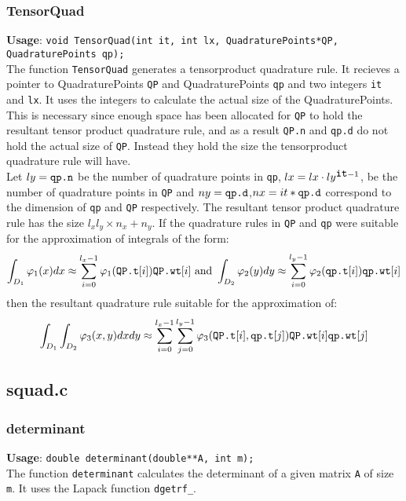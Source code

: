 \documentclass[a4paper,10pt]{article}
\begin{document}
\subsubsection{TensorQuad}
\textbf{Usage}: \verb=void TensorQuad(int it, int lx, QuadraturePoints*QP, QuadraturePoints qp);=\\
The function \verb=TensorQuad= generates a tensorproduct quadrature rule. It recieves a pointer to
 QuadraturePoints \verb=QP= and QuadraturePoints \verb=qp= and two integers \verb=it=
and \verb=lx=. It uses the integers to calculate the actual size of the QuadraturePoints. This is necessary
since enough space has been allocated for \verb=QP= to hold the resultant tensor product quadrature rule, and
as a result \verb=QP.n= and \verb=qp.d= do not hold the actual size of \verb=QP=. Instead they hold the size
the tensorproduct quadrature rule will have.\\
Let $ly=\verb=qp.n=$ be the number of quadrature points in \verb=qp=, $lx=lx \cdot ly^{\verb=it=-1}$, be the number of 
quadrature points in \verb=QP= and $ny=\verb=qp.d=$,$nx=it*\verb=qp.d=$ correspond to the dimension of \verb=qp= and 
\verb=QP= respectively. The resultant tensor product quadrature rule has the size $l_x l_y \times n_x+n_y$.
If the quadrature rules in \verb=QP= and \verb=qp= were suitable for the approximation of integrals of the 
form:\begin{displaymath}
      \int_{D_1}\varphi_1(x)dx\approx\sum_{i=0}^{l_x-1}\varphi_1(\verb=QP.t=[i])\verb=QP.wt=[i] \text{ and }
      \int_{D_2}\varphi_2(y)dy\approx\sum_{i=0}^{l_y-1}\varphi_2(\verb=qp.t=[i])\verb=qp.wt=[i]
     \end{displaymath}
then the resultant quadrature rule suitable for the approximation of:
\begin{displaymath}
 \int_{D_1}\int_{D_2}\varphi_3(x,y)dx dy\approx\sum_{i=0}^{l_x-1}\sum_{j=0}^{l_y-1}
                \varphi_3(\verb=QP.t=[i],\verb=qp.t=[j])\verb=QP.wt=[i]\verb=qp.wt=[j]
\end{displaymath}

\subsection{squad.c}
\subsubsection{determinant}
\textbf{Usage}: \verb=double determinant(double**A, int m);=\\
The function \verb=determinant= calculates the determinant of a given matrix \verb=A= of size \verb=m=.
It uses the Lapack function \verb=dgetrf_=.
\end{document}
